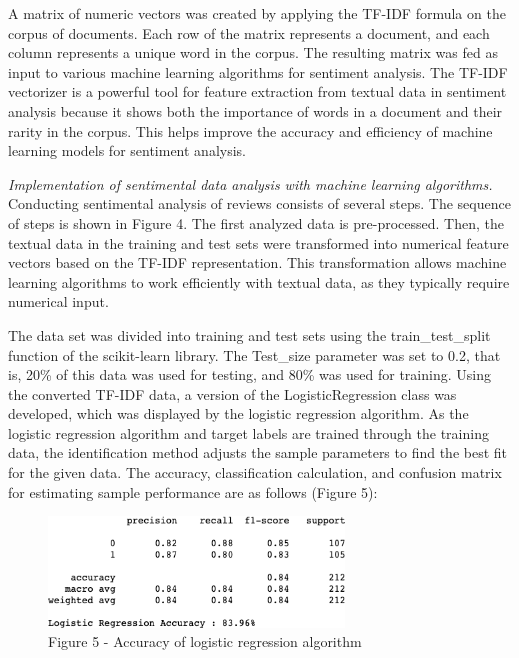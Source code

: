 \begin{multicols}{2}
A matrix of numeric vectors was created by applying the TF-IDF formula
on the corpus of documents. Each row of the matrix represents a
document, and each column represents a unique word in the corpus. The
resulting matrix was fed as input to various machine learning algorithms
for sentiment analysis. The TF-IDF vectorizer is a powerful tool for
feature extraction from textual data in sentiment analysis because it
shows both the importance of words in a document and their rarity in the
corpus. This helps improve the accuracy and efficiency of machine
learning models for sentiment analysis.

\emph{Implementation of sentimental data analysis with machine learning
algorithms.} Conducting sentimental analysis of reviews consists of
several steps. The sequence of steps is shown in Figure 4. The first
analyzed data is pre-processed. Then, the textual data in the training
and test sets were transformed into numerical feature vectors based on
the TF-IDF representation. This transformation allows machine learning
algorithms to work efficiently with textual data, as they typically
require numerical input.

The data set was divided into training and test sets using the
train\_test\_split function of the scikit-learn library. The Test\_size
parameter was set to 0.2, that is, 20\% of this data was used for
testing, and 80\% was used for training. Using the converted TF-IDF
data, a version of the LogisticRegression class was developed, which was
displayed by the logistic regression algorithm. As the logistic
regression algorithm and target labels are trained through the training
data, the identification method adjusts the sample parameters to find
the best fit for the given data. The accuracy, classification
calculation, and confusion matrix for estimating sample performance are
as follows (Figure 5):
\end{multicols}

\begin{figure}[H]
	\centering
	\includegraphics[width=0.7\textwidth]{media/ict/image12}
	\caption*{Figure 5 - Accuracy of logistic regression algorithm}
\end{figure}

